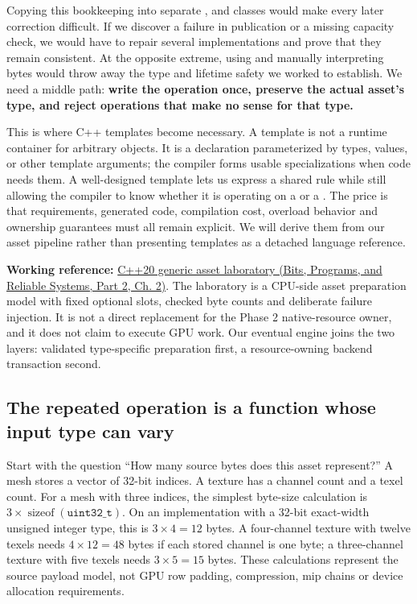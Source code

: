 Copying this bookkeeping into separate ,  and  classes would make every later correction difficult. If we discover a failure in publication or a missing capacity check, we would have to repair several implementations and prove that they remain consistent. At the opposite extreme, using  and manually interpreting bytes would throw away the type and lifetime safety we worked to establish. We need a middle path: \textbf{write the operation once, preserve the actual asset's type, and reject operations that make no sense for that type.}

This is where C++ templates become necessary. A template is not a runtime container for arbitrary objects. It is a declaration parameterized by types, values, or other template arguments; the compiler forms usable specializations when code needs them. A well-designed template lets us express a shared rule while still allowing the compiler to know whether it is operating on a  or a . The price is that requirements, generated code, compilation cost, overload behavior and ownership guarantees must all remain explicit. We will derive them from our asset pipeline rather than presenting templates as a detached language reference.

\textbf{Working reference:} \href{../01-Bits-Programs-and-Reliable-Systems-P02/main.pdf\#nameddest=source-file-a5db53514d74ae247b4ac42f}{C++20 generic asset laboratory (Bits, Programs, and Reliable Systems, Part 2, Ch. 2)}. The laboratory is a CPU-side asset preparation model with fixed optional slots, checked byte counts and deliberate failure injection. It is not a direct replacement for the Phase 2 native-resource owner, and it does not claim to execute GPU work. Our eventual engine joins the two layers: validated type-specific preparation first, a resource-owning backend transaction second.

\subsection{The repeated operation is a function whose input type can vary}\label{05-engine-i-ch005-the-repeated-operation-is-a-function-whose-input-type-can-vary}

\hypertarget{05-engine-i-ch005-the-repeated-operation-is-a-function-whose-input-type-can-vary}{}

Start with the question ``How many source bytes does this asset represent?'' A mesh stores a vector of 32-bit indices. A texture has a channel count and a texel count. For a mesh with three indices, the simplest byte-size calculation is \(3\times\operatorname{sizeof}(\texttt{uint32\_t})\). On an implementation with a 32-bit exact-width unsigned integer type, this is \(3\times4=12\) bytes. A four-channel texture with twelve texels needs \(4\times12=48\) bytes if each stored channel is one byte; a three-channel texture with five texels needs \(3\times5=15\) bytes. These calculations represent the source payload model, not GPU row padding, compression, mip chains or device allocation requirements.

